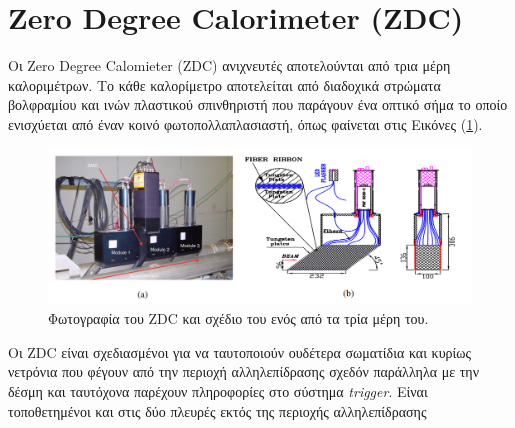 \section{Zero Degree Calorimeter (ZDC) }

	Οι Zero Degree Calomieter (ZDC) ανιχνευτές αποτελούνται από τρια μέρη καλοριμέτρων. Το κάθε καλορίμετρο αποτελείται από διαδοχικά στρώματα βολφραμίου και ινών πλαστικού σπινθηριστή που παράγουν ένα οπτικό σήμα το οποίο ενισχύεται από έναν κοινό φωτοπολλαπλασιαστή, όπως φαίνεται στις Εικόνες (\ref{fig3.27}).
	
	\begin{figure}[h!]
		\centering
		\includegraphics[scale=0.5]{STAR_Detectors/ZDC}
		\caption{Φωτογραφία του ZDC και σχέδιο του ενός από τα τρία μέρη του.}
		\label{fig3.27}
	\end{figure}
	
	Οι ZDC είναι σχεδιασμένοι για να ταυτοποιούν ουδέτερα σωματίδια και κυρίως νετρόνια που φέγουν από την περιοχή αλληλεπίδρασης σχεδόν παράλληλα με την δέσμη και ταυτόχονα παρέχουν πληροφορίες στο σύστημα \textit{trigger}. Είναι τοποθετημένοι και στις δύο πλευρές εκτός της περιοχής αλληλεπίδρασης 